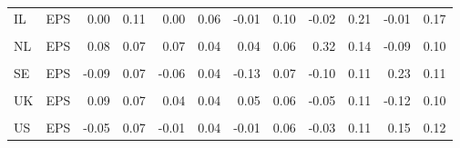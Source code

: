 \begin{table}
\begin{tabular}[t]{llrrrrrrrrrr}
IL & EPS & 0.00 & 0.11 & 0.00 & 0.06 & -0.01 & 0.10 & -0.02 & 0.21 & -0.01 & 0.17\\
\cellcolor{gray!10}{NL} & \cellcolor{gray!10}{(Intercept)} & \cellcolor{gray!10}{0.05} & \cellcolor{gray!10}{0.14} & \cellcolor{gray!10}{0.03} & \cellcolor{gray!10}{0.08} & \cellcolor{gray!10}{0.02} & \cellcolor{gray!10}{0.11} & \cellcolor{gray!10}{0.14} & \cellcolor{gray!10}{0.30} & \cellcolor{gray!10}{-0.05} & \cellcolor{gray!10}{0.18}\\
NL & EPS & 0.08 & 0.07 & 0.07 & 0.04 & 0.04 & 0.06 & 0.32 & 0.14 & -0.09 & 0.10\\
\cellcolor{gray!10}{SE} & \cellcolor{gray!10}{(Intercept)} & \cellcolor{gray!10}{-0.05} & \cellcolor{gray!10}{0.14} & \cellcolor{gray!10}{-0.02} & \cellcolor{gray!10}{0.08} & \cellcolor{gray!10}{-0.06} & \cellcolor{gray!10}{0.15} & \cellcolor{gray!10}{-0.03} & \cellcolor{gray!10}{0.22} & \cellcolor{gray!10}{0.10} & \cellcolor{gray!10}{0.23}\\
SE & EPS & -0.09 & 0.07 & -0.06 & 0.04 & -0.13 & 0.07 & -0.10 & 0.11 & 0.23 & 0.11\\
\cellcolor{gray!10}{UK} & \cellcolor{gray!10}{(Intercept)} & \cellcolor{gray!10}{0.05} & \cellcolor{gray!10}{0.14} & \cellcolor{gray!10}{0.02} & \cellcolor{gray!10}{0.07} & \cellcolor{gray!10}{0.02} & \cellcolor{gray!10}{0.12} & \cellcolor{gray!10}{-0.02} & \cellcolor{gray!10}{0.20} & \cellcolor{gray!10}{-0.05} & \cellcolor{gray!10}{0.20}\\
UK & EPS & 0.09 & 0.07 & 0.04 & 0.04 & 0.05 & 0.06 & -0.05 & 0.11 & -0.12 & 0.10\\
\cellcolor{gray!10}{US} & \cellcolor{gray!10}{(Intercept)} & \cellcolor{gray!10}{-0.04} & \cellcolor{gray!10}{0.12} & \cellcolor{gray!10}{-0.01} & \cellcolor{gray!10}{0.06} & \cellcolor{gray!10}{0.00} & \cellcolor{gray!10}{0.10} & \cellcolor{gray!10}{-0.02} & \cellcolor{gray!10}{0.20} & \cellcolor{gray!10}{0.09} & \cellcolor{gray!10}{0.20}\\
US & EPS & -0.05 & 0.07 & -0.01 & 0.04 & -0.01 & 0.06 & -0.03 & 0.11 & 0.15 & 0.12\\
\bottomrule
\end{tabular}
\end{table}
